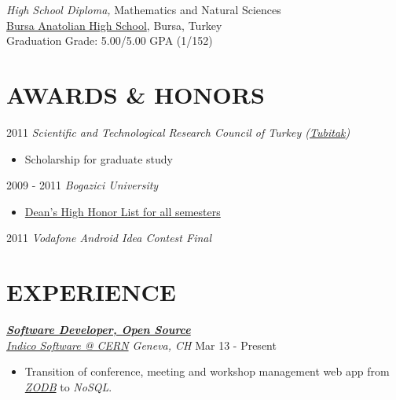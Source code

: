 \documentclass[line, margin]{res}
\begin{document}
\begin{resume}
	{\sl High School Diploma,} Mathematics and Natural Sciences \\
	\href{http://www.bursaanadolulisesi.k12.tr/}{Bursa Anatolian High School}, Bursa, Turkey \\
	Graduation Grade: 5.00/5.00 GPA (1/152)               

\vspace{-0.2cm}

\section{AWARDS \& HONORS}
	2011 {\sl Scientific and Technological Research Council of Turkey 						(\href{http://www.tubitak.gov.tr/en/ot/10/}{Tubitak})} \\
	\vspace{-.3cm}				
	\begin{itemize} 
		\item Scholarship for graduate study
	\end{itemize}
	
	\vspace{-0.4cm}			
	2009 - 2011 {\sl Bogazici University }
	\begin{itemize} \itemsep -2pt
		\item \href{http://www.eng.boun.edu.tr/current_students.html}{Dean's High Honor List for all semesters}	
	\end{itemize}

  \vspace{-0.4cm}
	2011 {\sl Vodafone Android Idea Contest Final} \\
 
\vspace{-0.4cm} 

\section{EXPERIENCE}

  {\sl \textbf{\href{http://indico-software.org/}{Software Developer, Open Source}} \\ \href{http://indico.cern.ch/}{Indico Software @ CERN} Geneva, CH} \hfill Mar 13 - Present \\
  \vspace{-0.3cm}
  \begin{itemize}
    \item Transition of conference, meeting and workshop management web app from \textit{\href{http://www.zodb.org/}{ZODB}} to \textit{NoSQL}.
  \end{itemize}


\end{resume}
\end{document}

